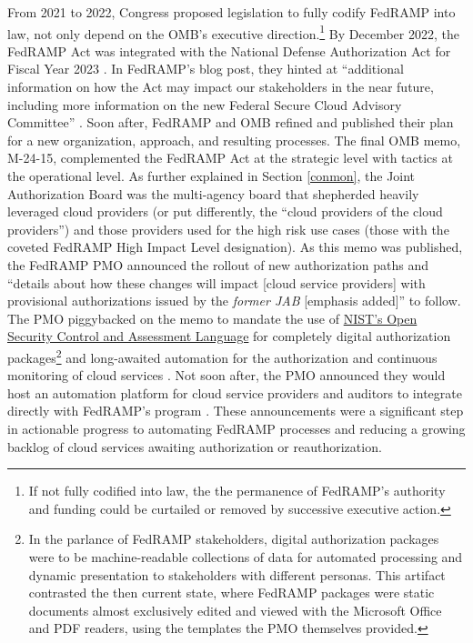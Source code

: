 \documentclass{jdf}
\begin{document}
From 2021 to 2022, Congress proposed legislation to fully codify FedRAMP into law, not only depend on the OMB's executive direction.\footnote{If not fully codified into law, the the permanence of FedRAMP's authority and funding could be curtailed or removed by successive executive action.} By December 2022, the FedRAMP Act was integrated with the National Defense Authorization Act for Fiscal Year 2023 \cite{ndaa2023}. In FedRAMP's blog post, they hinted at ``additional information on how the Act may impact our stakeholders in the near future, including more information on the new Federal Secure Cloud Advisory Committee'' \citeyear{fedramp_blog_ndaa2023}. Soon after, FedRAMP and OMB refined and published their plan for a new organization, approach, and resulting processes. The final OMB memo, M-24-15, complemented the FedRAMP Act at the strategic level with tactics at the operational level. As further explained in Section \ref{conmon}, the Joint Authorization Board was the multi-agency board that shepherded heavily leveraged cloud providers (or put differently, the ``cloud providers of the cloud providers'') and those providers used for the high risk use cases (those with the coveted FedRAMP High Impact Level designation). As this memo was published, the FedRAMP PMO announced the rollout of new authorization paths and ``details about how these changes will impact [cloud service providers] with provisional authorizations issued by the \textit{former JAB} [emphasis added]'' \citeyear{fedramp_blog_phase24} to follow. The PMO piggybacked on the memo to mandate the use of \hyperlink{https://pages.nist.gov/OSCAL}{NIST's Open Security Control and Assessment Language} for completely digital authorization packages\footnote{In the parlance of FedRAMP stakeholders, digital authorization packages were to be machine-readable collections of data for automated processing and dynamic presentation to stakeholders with different personas. This artifact contrasted the then current state, where FedRAMP packages were static documents almost exclusively edited and viewed with the Microsoft Office and PDF readers, using the templates the PMO themselves provided.} and long-awaited automation for the authorization and continuous monitoring of cloud services \citeyear{fedramp_blog_phase24}. Not soon after, the PMO announced they would host an automation platform for cloud service providers and auditors to integrate directly with FedRAMP's program \citeyear{fedramp_blog_platform24}. These announcements were a significant step in actionable progress to automating FedRAMP processes and reducing a growing backlog of cloud services awaiting authorization or reauthorization.
\end{document}
